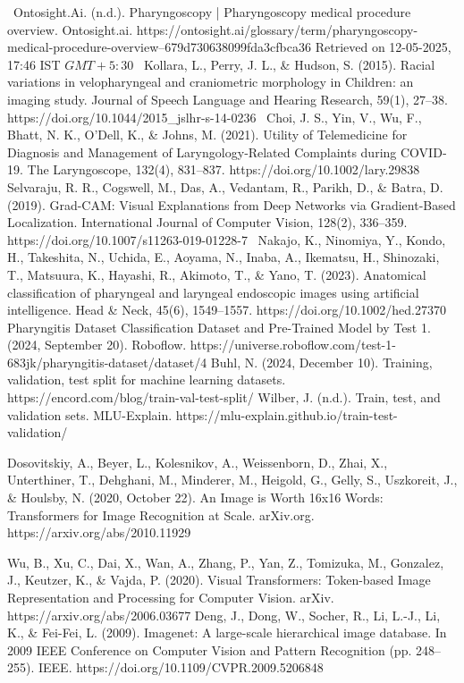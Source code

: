 \begin{thebibliography}{}
~Ontosight.Ai. (n.d.). Pharyngoscopy | Pharyngoscopy medical procedure overview. Ontosight.ai. https://ontosight.ai/glossary/term/pharyngoscopy-medical-procedure-overview--679d730638099fda3cfbca36 Retrieved on 12-05-2025, 17:46 IST \(GMT +5:30\)
~Kollara, L., Perry, J. L., \& Hudson, S. (2015). Racial variations in velopharyngeal and craniometric morphology in Children: an imaging study. Journal of Speech Language and Hearing Research, 59(1), 27–38. https://doi.org/10.1044/2015\_jslhr-s-14-0236
~Choi, J. S., Yin, V., Wu, F., Bhatt, N. K., O’Dell, K., \& Johns, M. (2021). Utility of Telemedicine for Diagnosis and Management of Laryngology‐Related Complaints during COVID‐19. The Laryngoscope, 132(4), 831–837. https://doi.org/10.1002/lary.29838
Selvaraju, R. R., Cogswell, M., Das, A., Vedantam, R., Parikh, D., \& Batra, D. (2019). Grad-CAM: Visual Explanations from Deep Networks via Gradient-Based Localization. International Journal of Computer Vision, 128(2), 336–359. https://doi.org/10.1007/s11263-019-01228-7
~Nakajo, K., Ninomiya, Y., Kondo, H., Takeshita, N., Uchida, E., Aoyama, N., Inaba, A., Ikematsu, H., Shinozaki, T., Matsuura, K., Hayashi, R., Akimoto, T., \& Yano, T. (2023). Anatomical classification of pharyngeal and laryngeal endoscopic images using artificial intelligence. Head \& Neck, 45(6), 1549–1557. https://doi.org/10.1002/hed.27370
Pharyngitis Dataset Classification Dataset and Pre-Trained Model by Test 1. (2024, September 20). Roboflow. https://universe.roboflow.com/test-1-683jk/pharyngitis-dataset/dataset/4
Buhl, N. (2024, December 10). Training, validation, test split for machine learning datasets. https://encord.com/blog/train-val-test-split/
Wilber, J. (n.d.). Train, test, and validation sets. MLU-Explain. https://mlu-explain.github.io/train-test-validation/





Dosovitskiy, A., Beyer, L., Kolesnikov, A., Weissenborn, D., Zhai, X., Unterthiner, T., Dehghani, M., Minderer, M., Heigold, G., Gelly, S., Uszkoreit, J., \& Houlsby, N. (2020, October 22). An Image is Worth 16x16 Words: Transformers for Image Recognition at Scale. arXiv.org. https://arxiv.org/abs/2010.11929

Wu, B., Xu, C., Dai, X., Wan, A., Zhang, P., Yan, Z., Tomizuka, M., Gonzalez, J., Keutzer, K., \& Vajda, P. (2020). Visual Transformers: Token-based Image Representation and Processing for Computer Vision. arXiv. https://arxiv.org/abs/2006.03677
Deng, J., Dong, W., Socher, R., Li, L.-J., Li, K., \& Fei-Fei, L. (2009). Imagenet: A large-scale hierarchical image database. In 2009 IEEE Conference on Computer Vision and Pattern Recognition (pp. 248–255). IEEE. https://doi.org/10.1109/CVPR.2009.5206848


\end{thebibliography}
